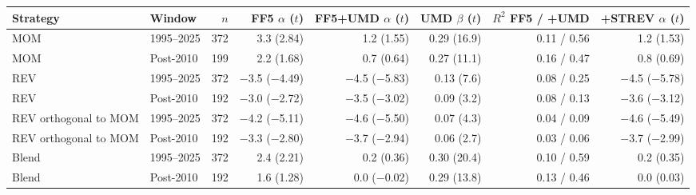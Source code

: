 \begin{tabular}{llrrrrrr}
\toprule
Strategy & Window & $n$ & FF5 $\alpha$ ($t$) & FF5+UMD $\alpha$ ($t$) & UMD $\beta$ ($t$) & $R^2$ FF5 / +UMD & +STREV $\alpha$ ($t$) \\
\midrule
MOM & 1995--2025 & 372 & 3.3 (2.84) & 1.2 (1.55) & 0.29 (16.9) & 0.11 / 0.56 & 1.2 (1.53) \\
MOM & Post-2010 & 199 & 2.2 (1.68) & 0.7 (0.64) & 0.27 (11.1) & 0.16 / 0.47 & 0.8 (0.69) \\
REV & 1995--2025 & 372 & $-$3.5 ($-$4.49) & $-$4.5 ($-$5.83) & 0.13 (7.6) & 0.08 / 0.25 & $-$4.5 ($-$5.78) \\
REV & Post-2010 & 192 & $-$3.0 ($-$2.72) & $-$3.5 ($-$3.02) & 0.09 (3.2) & 0.08 / 0.13 & $-$3.6 ($-$3.12) \\
REV orthogonal to MOM & 1995--2025 & 372 & $-$4.2 ($-$5.11) & $-$4.6 ($-$5.50) & 0.07 (4.3) & 0.04 / 0.09 & $-$4.6 ($-$5.49) \\
REV orthogonal to MOM & Post-2010 & 192 & $-$3.3 ($-$2.80) & $-$3.7 ($-$2.94) & 0.06 (2.7) & 0.03 / 0.06 & $-$3.7 ($-$2.99) \\
Blend & 1995--2025 & 372 & 2.4 (2.21) & 0.2 (0.36) & 0.30 (20.4) & 0.10 / 0.59 & 0.2 (0.35) \\
Blend & Post-2010 & 192 & 1.6 (1.28) & 0.0 ($-$0.02) & 0.29 (13.8) & 0.13 / 0.46 & 0.0 (0.03) \\
\bottomrule
\end{tabular}
